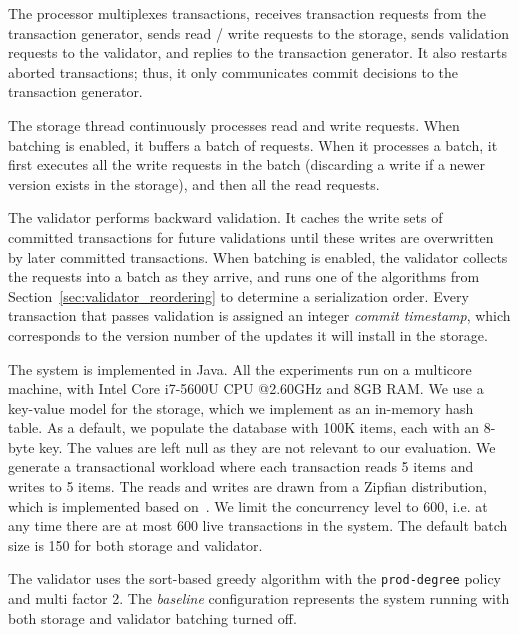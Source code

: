 The processor multiplexes transactions, receives transaction requests from the transaction generator, sends read / write requests to the storage, sends validation requests to the validator, and replies to the transaction generator. It also restarts aborted transactions; thus, it only communicates commit decisions to the transaction generator. 

The storage thread continuously processes read and write requests. When batching is enabled, it buffers a batch of requests. When it processes a batch, it first executes all the write requests in the batch (discarding a write if a newer version exists in the storage), and then all the read requests.

The validator performs backward validation. It caches the write sets of committed transactions for future validations until these writes are overwritten by later committed transactions. 
When batching is enabled, the validator collects the requests into a batch as they arrive, and runs one of the algorithms from Section~\ref{sec:validator_reordering} to determine a serialization order. Every transaction that passes validation is assigned an integer \emph{commit timestamp}, which corresponds to the version number of the updates it will install in the storage.


The system is implemented in Java. All the experiments run on a multicore machine, with Intel Core i7-5600U CPU @2.60GHz and 8GB RAM. We use a key-value model for the storage, which we implement as an in-memory hash table. As a default, we populate the database with 100K items, each with an 8-byte key. The values are left null as they are not relevant to our evaluation. We generate a transactional workload where each transaction reads 5 items and writes to 5 items. The reads and writes are drawn from a Zipfian distribution, which is implemented based on~\cite{gray1994quickly}. We limit the concurrency level to 600, i.e. at any time there are at most 600 live transactions in the system. The default batch size is 150 for both storage and validator.

The validator uses the sort-based greedy algorithm with the \texttt{prod-degree} policy and multi factor 2. The \emph{baseline} configuration represents the system running with both storage and validator batching turned off. 

